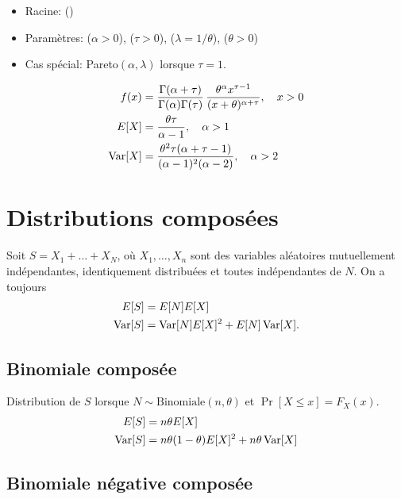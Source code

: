 \begin{itemize}
\item Racine:  ()
\item Paramètres:  ($\alpha > 0$),
       ($\tau > 0$),
         ($\lambda = 1/\theta$),
        ($\theta > 0$)
\end{itemize}
\begin{itemize}
\item Cas spécial: Pareto$(\alpha, \lambda)$ lorsque $\tau = 1$.
\end{itemize}
\begin{align*}
  f(x) &=
  \frac{\Gamma(\alpha + \tau)}{\Gamma(\alpha) \Gamma(\tau)}\,
  \frac{\theta^\alpha x^{\tau - 1}}{(x + \theta)^{\alpha+\tau}},
  \quad x > 0 \\
  E [ X ]
  &= \frac{\theta \tau}{\alpha - 1}, \quad \alpha > 1 \\
  \operatorname{Var} [ X ]
  &= \frac{\theta^2 \tau (\alpha + \tau - 1)}{(\alpha - 1)^2 (\alpha
    - 2)}, \quad \alpha > 2
\end{align*}


\section{Distributions composées}

Soit $S = X_1 + \dots + X_N$, où $X_1, \dots, X_n$ sont des variables
aléatoires mutuellement indépendantes, identiquement distribuées et
toutes indépendantes de $N$. On a toujours
\begin{align*}
  E [ S ] &= E [ N ] E [ X ] \\
  \operatorname{Var} [ S ] &= \operatorname{Var} [ N ] E [ X ]^2 + E [ N ] \operatorname{Var} [ X ].
\end{align*}

\subsection{Binomiale composée}
\label{sec:distributions:binomialecomposée}

Distribution de $S$ lorsque $N \sim \text{Binomiale}(n, \theta)$ et
$\Pr[X \leq x] = F_X(x)$.
\begin{align*}
  E [ S ] &= n \theta E [ X ] \\
  \operatorname{Var} [ S ] &= n\theta(1 - \theta) E [ X ]^2 + n \theta \operatorname{Var} [ X ]
\end{align*}

\subsection{Binomiale négative composée}
\label{sec:distributions:binomialenegativecomposée}

